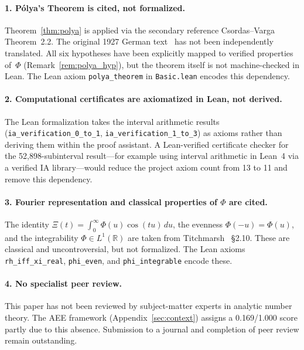 \documentclass[11pt]{article}
\theoremstyle{definition}
\theoremstyle{remark}
\begin{document}
\paragraph{1. P\'olya's Theorem is cited, not formalized.}
Theorem~\ref{thm:polya} is applied via the secondary reference Csordas--Varga~\cite{csordas1989} Theorem~2.2. The original 1927 German text~\cite{polya1927} has not been independently translated. All six hypotheses have been explicitly mapped to verified properties of~$\Phi$ (Remark~\ref{rem:polya_hyp}), but the theorem itself is not machine-checked in Lean. The Lean axiom \texttt{polya\_theorem} in \texttt{Basic.lean} encodes this dependency.

\paragraph{2. Computational certificates are axiomatized in Lean, not derived.}
The Lean formalization takes the interval arithmetic results (\texttt{ia\_verification\_0\_to\_1}, \texttt{ia\_verification\_1\_to\_3}) as axioms rather than deriving them within the proof assistant. A Lean-verified certificate checker for the 52{,}898-subinterval result---for example using interval arithmetic in Lean~4 via a verified IA library---would reduce the project axiom count from 13 to 11 and remove this dependency.

\paragraph{3. Fourier representation and classical properties of $\Phi$ are cited.}
The identity $\Xi(t) = \int_0^\infty\Phi(u)\cos(tu)\,du$, the evenness $\Phi(-u)=\Phi(u)$, and the integrability $\Phi\in L^1(\mathbb{R})$ are taken from Titchmarsh~\cite{titchmarsh1986} \S2.10. These are classical and uncontroversial, but not formalized. The Lean axioms \texttt{rh\_iff\_xi\_real}, \texttt{phi\_even}, and \texttt{phi\_integrable} encode these.

\paragraph{4. No specialist peer review.}
This paper has not been reviewed by subject-matter experts in analytic number theory. The AEE framework (Appendix~\ref{sec:context}) assigns a 0.169/1.000 score partly due to this absence. Submission to a journal and completion of peer review remain outstanding.



\end{document}
